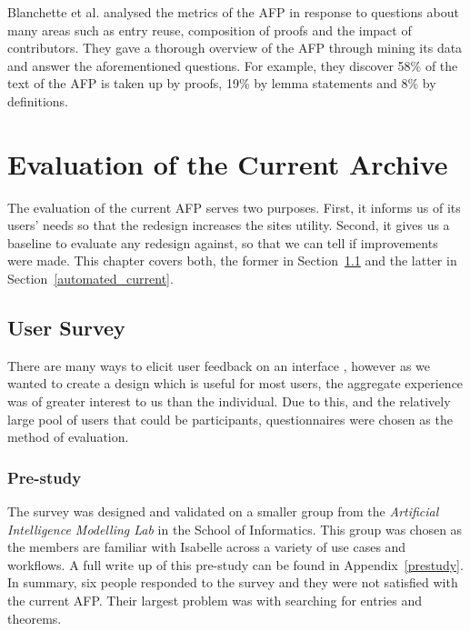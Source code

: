 \documentclass[bsc,frontabs,oneside,singlespacing,parskip,deptreport,logo]{infthesis}
\begin{document}
Blanchette et al. \cite{DBLP:conf/mkm/BlanchetteHMN15} analysed the metrics of the AFP in response to questions about many areas such as entry reuse, composition of proofs and the impact of contributors. They gave a thorough overview of the AFP through mining its data and answer the aforementioned questions. For example, they discover 58\% of the text of the AFP is taken up by proofs, 19\% by lemma statements and 8\% by definitions. 



\chapter{Evaluation of the Current Archive} \label{evaluation-current}


The evaluation of the current AFP serves two purposes. First, it informs us of its users' needs so that the redesign increases the sites utility. Second, it gives us a baseline to evaluate any redesign against, so that we can tell if improvements were made. This chapter covers both, the former in Section~\ref{sec:user-survey} and the latter in Section~\ref{automated_current}.

\section{User Survey} \label{sec:user-survey}
 
There are many ways to elicit user feedback on an interface \cite{hanington2012universal}, however as we wanted to create a design which is useful for most users, the aggregate experience was of greater interest to us than the individual. Due to this, and the relatively large pool of users that could be participants, questionnaires were chosen as the method of evaluation.

\subsection{Pre-study} \label{sec:pre-study}

The survey was designed and validated on a smaller group from the \emph{Artificial Intelligence Modelling Lab} in the School of Informatics. This group was chosen as the members are familiar with Isabelle across a variety of use cases and workflows. A full write up of this pre-study can be found in Appendix~\ref{prestudy}. In summary, six people responded to the survey and they were not satisfied with the current AFP\@. Their largest problem was with searching for entries and theorems.
\end{document}
